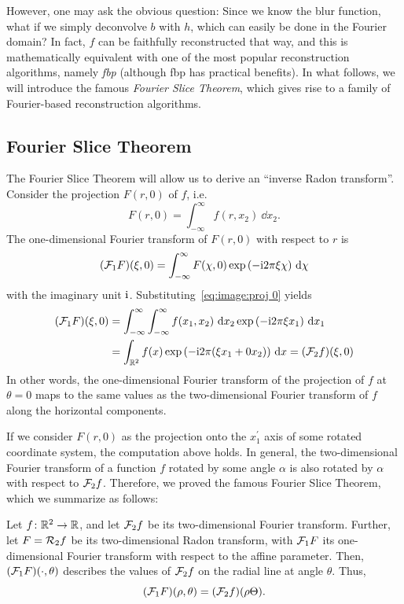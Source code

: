\documentclass[../ml-ct.tex]{subfiles}
\begin{document}
However, one may ask the obvious question:
Since we know the blur function, what if we simply deconvolve \( b \) with \( h \), which can easily be done in the Fourier domain?
In fact, \( f \) can be faithfully reconstructed that way, and this is mathematically equivalent with one of the most popular reconstruction algorithms, namely \emph{\gls{fbp}} (although \gls{fbp} has practical benefits).
In what follows, we will introduce the famous \emph{Fourier Slice Theorem}, which gives rise to a family of Fourier-based reconstruction algorithms.
\subsection{Fourier Slice Theorem}
The Fourier Slice Theorem will allow us to derive an \enquote{inverse Radon transform}.
Consider the projection \( F(r, 0) \) of \( f \), i.e.
\begin{equation}
	F(r, 0) = \int_{-\infty}^{\infty} f(r, x_2)\ \dd x_2.%
	\label{eq:image:proj 0}
\end{equation}
The one-dimensional Fourier transform of \( F(r, 0) \) with respect to \( r \) is
\begin{equation}
	(\mathcal{F}_1 F)(\xi, 0) = \int_{-\infty}^\infty F(\chi, 0) \exp{(-\mathrm{i}2\pi\xi \chi)}\ \mathrm{d} \chi
\end{equation}
with the imaginary unit \( \mathrm{i} \).
Substituting~\cref{eq:image:proj 0} yields
\begin{equation}
	\begin{aligned}
		(\mathcal{F}_1 F)(\xi, 0) & = \int_{-\infty}^{\infty} \int_{-\infty}^{\infty} f(x_1, x_2)\ \mathrm{d} x_2  \exp{(-\mathrm{i}2\pi\xi x_1)}\ \mathrm{d} x_1 \\
				  & = \int_{\mathbb{R}^2} f(x) \exp{(-\mathrm{i}2\pi(\xi x_1 + 0x_2))}\ \mathrm{d} x = (\mathcal{F}_2 f)(\xi, 0)
	\end{aligned}
\end{equation}
In other words, the one-dimensional Fourier transform of the projection of \( f \) at \( \theta = 0 \) maps to the same values as the two-dimensional Fourier transform of \( f \) along the horizontal components.

If we consider \( F(r, 0) \) as the projection onto the \( x_1^\prime \) axis of some rotated coordinate system, the computation above holds.
In general, the two-dimensional Fourier transform of a function \( f \) rotated by some angle \( \alpha \) is also rotated by \( \alpha \) with respect to \( \mathcal{F}_2 f \).
Therefore, we proved the famous Fourier Slice Theorem, which we summarize as follows:
\begin{tcolorbox}[colback=lightgray]
	Let \( f\colon\mathbb{R}^2\to\mathbb{R} \), and let \( \mathcal{F}_2 f \) be its two-dimensional Fourier transform.
	Further, let \( F = \mathcal{R}_2 f \) be its two-dimensional Radon transform, with \( \mathcal{F}_1 F \) its one-dimensional Fourier transform with respect to the affine parameter.
	Then, \( (\mathcal{F}_1 F)(\cdot, \theta) \) describes the values of \( \mathcal{F}_2 f \) on the radial line at angle \( \theta \).
	Thus, \begin{equation} (\mathcal{F}_1 F)(\rho, \theta) = (\mathcal{F}_2 f)(\rho \Theta).\label{eq:image:projection slice theorem} \end{equation}
\end{tcolorbox}
\end{document}
